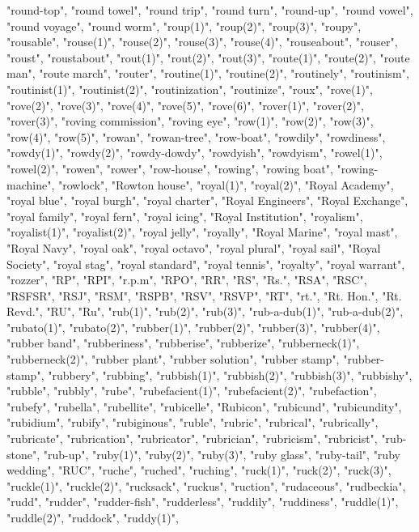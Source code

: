 "round-top",
"round towel",
"round trip",
"round turn",
"round-up",
"round vowel",
"round voyage",
"round worm",
"roup(1)",
"roup(2)",
"roup(3)",
"roupy",
"rousable",
"rouse(1)",
"rouse(2)",
"rouse(3)",
"rouse(4)",
"rouseabout",
"rouser",
"roust",
"roustabout",
"rout(1)",
"rout(2)",
"rout(3)",
"route(1)",
"route(2)",
"route man",
"route march",
"router",
"routine(1)",
"routine(2)",
"routinely",
"routinism",
"routinist(1)",
"routinist(2)",
"routinization",
"routinize",
"roux",
"rove(1)",
"rove(2)",
"rove(3)",
"rove(4)",
"rove(5)",
"rove(6)",
"rover(1)",
"rover(2)",
"rover(3)",
"roving commission",
"roving eye",
"row(1)",
"row(2)",
"row(3)",
"row(4)",
"row(5)",
"rowan",
"rowan-tree",
"row-boat",
"rowdily",
"rowdiness",
"rowdy(1)",
"rowdy(2)",
"rowdy-dowdy",
"rowdyish",
"rowdyism",
"rowel(1)",
"rowel(2)",
"rowen",
"rower",
"row-house",
"rowing",
"rowing boat",
"rowing-machine",
"rowlock",
"Rowton house",
"royal(1)",
"royal(2)",
"Royal Academy",
"royal blue",
"royal burgh",
"royal charter",
"Royal Engineers",
"Royal Exchange",
"royal family",
"royal fern",
"royal icing",
"Royal Institution",
"royalism",
"royalist(1)",
"royalist(2)",
"royal jelly",
"royally",
"Royal Marine",
"royal mast",
"Royal Navy",
"royal oak",
"royal octavo",
"royal plural",
"royal sail",
"Royal Society",
"royal stag",
"royal standard",
"royal tennis",
"royalty",
"royal warrant",
"rozzer",
"RP",
"RPI",
"r.p.m",
"RPO",
"RR",
"RS",
"Rs.",
"RSA",
"RSC",
"RSFSR",
"RSJ",
"RSM",
"RSPB",
"RSV",
"RSVP",
"RT",
"rt.",
"Rt. Hon.",
"Rt. Revd.",
"RU",
"Ru",
"rub(1)",
"rub(2)",
"rub(3)",
"rub-a-dub(1)",
"rub-a-dub(2)",
"rubato(1)",
"rubato(2)",
"rubber(1)",
"rubber(2)",
"rubber(3)",
"rubber(4)",
"rubber band",
"rubberiness",
"rubberise",
"rubberize",
"rubberneck(1)",
"rubberneck(2)",
"rubber plant",
"rubber solution",
"rubber stamp",
"rubber-stamp",
"rubbery",
"rubbing",
"rubbish(1)",
"rubbish(2)",
"rubbish(3)",
"rubbishy",
"rubble",
"rubbly",
"rube",
"rubefacient(1)",
"rubefacient(2)",
"rubefaction",
"rubefy",
"rubella",
"rubellite",
"rubicelle",
"Rubicon",
"rubicund",
"rubicundity",
"rubidium",
"rubify",
"rubiginous",
"ruble",
"rubric",
"rubrical",
"rubrically",
"rubricate",
"rubrication",
"rubricator",
"rubrician",
"rubricism",
"rubricist",
"rub-stone",
"rub-up",
"ruby(1)",
"ruby(2)",
"ruby(3)",
"ruby glass",
"ruby-tail",
"ruby wedding",
"RUC",
"ruche",
"ruched",
"ruching",
"ruck(1)",
"ruck(2)",
"ruck(3)",
"ruckle(1)",
"ruckle(2)",
"rucksack",
"ruckus",
"ruction",
"rudaceous",
"rudbeckia",
"rudd",
"rudder",
"rudder-fish",
"rudderless",
"ruddily",
"ruddiness",
"ruddle(1)",
"ruddle(2)",
"ruddock",
"ruddy(1)",
